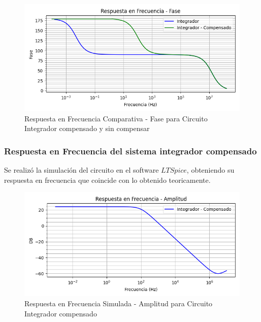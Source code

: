 \begin{figure}[H]
    \centering 
    \includegraphics [scale=0.6] {../Ejercicio3-CircuitoIntegradoresyDerivadores/Imagenes/diagrama-bode-integrador-compensado-comparativo-fase.png} 
    \caption{Respuesta en Frecuencia Comparativa - Fase para Circuito Integrador compensado y sin compensar }
    \label{fig:emptyPlotTool}
\end{figure}

\subsubsection{Respuesta en Frecuencia del sistema integrador compensado}

Se realizó la simulación del circuito en el software $LTSpice$, obteniendo su respuesta en frecuencia que coincide con lo obtenido teoricamente.

\begin{figure}[H]
    \centering 
    \includegraphics [scale=0.6] {../Ejercicio3-CircuitoIntegradoresyDerivadores/Imagenes/diagrama-bode-integrador-simulado-compensado-amplitud.png} 
    \caption{Respuesta en Frecuencia Simulada - Amplitud para Circuito Integrador compensado}
    \label{fig:emptyPlotTool}
\end{figure}

